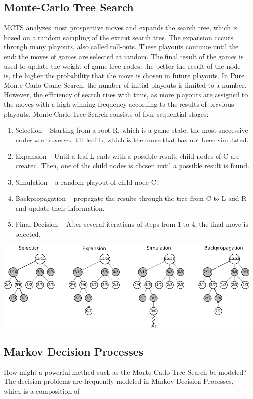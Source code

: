 \documentclass[paper=8.27in:11.69in]{scrartcl}
\begin{document}
\subsection{Monte-Carlo Tree Search}
MCTS analyzes most prospective moves and expands the search tree, which is based on a random sampling of the extant search tree. The expansion occurs through many playouts, also called roll-outs. These playouts continue until the end; the moves of games are selected at random. The final result of the games is used to update the weight of game tree nodes: the better the result of the node is, the higher the probability that the move is chosen in future playouts. In Pure Monte Carlo Game Search, the number of initial playouts is limited to a number. However, the efficiency of search rises with time, as more playouts are assigned to the moves with a high winning frequency according to the results of previous playouts. Monte-Carlo Tree Search consists of four sequential stages:

\begin{enumerate}[label=\arabic*)]
\item Selection – Starting from a root R, which is a game state, the most successive nodes are traversed till leaf L, which is the move that has not been simulated.
\item Expansion – Until a leaf L ends with a possible result, child nodes of C are created. Then, one of the child nodes is chosen until a possible result is found.
\item Simulation – a random playout of child node C.
\item Backpropagation – propagate the results through the tree from C to L and R and update their information.
\item Final Decision – After several iterations of steps from 1 to 4, the final move is selected.
\end{enumerate}


\includegraphics[scale=0.6]{MCTS}

\subsection{Markov Decision Processes}
How might a powerful method such as the Monte-Carlo Tree Search be modeled? The decision problems are frequently modeled in Markov Decision Processes, which is a composition of 
\end{document}
